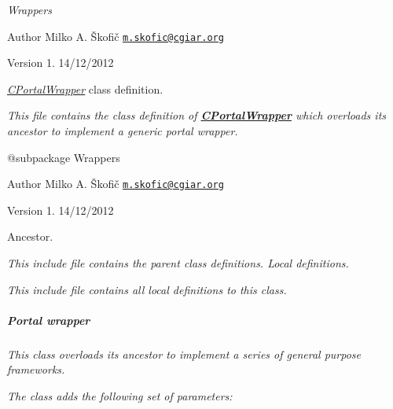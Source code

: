{\itshape  Wrappers}

{\itshape \begin{DoxyAuthor}{Author}
Milko A. Škofič \href{mailto:m.skofic@cgiar.org}{\tt m.\-skofic@cgiar.\-org} 
\end{DoxyAuthor}
\begin{DoxyVersion}{Version}
1. 14/12/2012
\end{DoxyVersion}
{\itshape \hyperlink{class_c_portal_wrapper}{C\-Portal\-Wrapper}} class definition.}

{\itshape This file contains the class definition of {\bfseries \hyperlink{class_c_portal_wrapper}{C\-Portal\-Wrapper}} which overloads its ancestor to implement a generic portal wrapper.}

{\itshape \begin{DoxyVerb} @subpackage        Wrappers
\end{DoxyVerb}
}

{\itshape \begin{DoxyAuthor}{Author}
Milko A. Škofič \href{mailto:m.skofic@cgiar.org}{\tt m.\-skofic@cgiar.\-org} 
\end{DoxyAuthor}
\begin{DoxyVersion}{Version}
1. 14/12/2012
\end{DoxyVersion}
Ancestor.}

{\itshape This include file contains the parent class definitions. Local definitions.}

{\itshape This include file contains all local definitions to this class. \subparagraph*{Portal wrapper}}

{\itshape }

{\itshape This class overloads its ancestor to implement a series of general purpose frameworks.}

{\itshape The class adds the following set of parameters\-:}

